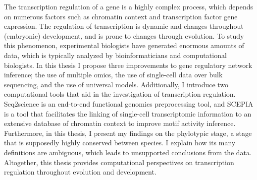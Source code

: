 The transcription regulation of a gene is a highly complex process, which depends on numerous factors such as chromatin context and transcription factor gene expression. The regulation of transcription is dynamic and changes throughout (embryonic) development, and is prone to changes through evolution. To study this phenomenon, experimental biologists have generated enormous amounts of data, which is typically analyzed by bioinformaticians and computational biologists. In this thesis I propose three improvements to gene regulatory network inference; the use of multiple omics, the use of single-cell data over bulk sequencing, and the use of universal models. Additionally, I introduce two computational tools that aid in the investigation of transcription regulation. Seq2science is an end-to-end functional genomics preprocessing tool, and SCEPIA is a tool that facilitates the linking of single-cell transcriptomic information to an extensive database of chromatin context to improve motif activity inference. Furthermore, in this thesis, I present my findings on the phylotypic stage, a stage that is supposedly highly conserved between species. I explain how its many definitions are ambiguous, which leads to unsupported conclusions from the data. Altogether, this thesis provides computational perspectives on transcription regulation throughout evolution and development. 
